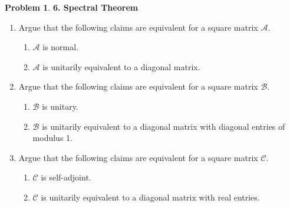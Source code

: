 \documentclass{book}
\theoremstyle{definition}
\newtheorem*{prob*}{Problem}
\newcommand{\A}{\mathcal{A}}
\newcommand{\B}{\mathcal{B}}
\begin{document}
\newpage

\begin{prob*}\textbf{6. Spectral Theorem }
	\begin{enumerate}
		\item Argue that the following claims are equivalent for a square matrix $\A$.
		\begin{enumerate}
			\item $\A$ is normal.
			\item $\A$ is unitarily equivalent to a diagonal matrix.
		\end{enumerate}
	
		\item Argue that the following claims are equivalent for a square matrix $\B$.
		\begin{enumerate}
			\item $\B$ is unitary.
			\item $\B$ is unitarily equivalent to a diagonal matrix with diagonal entries of modulus 1. 
		\end{enumerate}
	
	
		\item Argue that the following claims are equivalent for a square matrix $\mathcal{C}$.
		\begin{enumerate}
			\item $\mathcal{C}$ is self-adjoint.
			\item $\mathcal{C}$ is unitarily equivalent to a diagonal matrix with real entries. 
		\end{enumerate} 
	\end{enumerate}
\end{prob*}





\newpage
\end{document}

